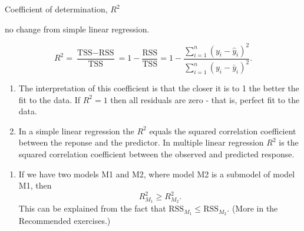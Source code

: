 \documentclass[ignorenonframetext,]{beamer}
\providecommand{\tightlist}{%
  \setlength{\itemsep}{0pt}\setlength{\parskip}{0pt}}
\begin{document}
\begin{frame}

\begin{block}{Coefficient of determination, \(R^2\)}

no change from simple linear regression.

\[R^2 = \frac{\text{TSS}-\text{RSS}}{\text{TSS}}= 1-\frac{\text{RSS}}{\text{TSS}}=1-\frac{\sum_{i=1}^n(y_i-\hat{y}_i)^2}{\sum_{i=1}^n(y_i-\bar{y}_i)^2}.\]

\begin{enumerate}
\def\labelenumi{\arabic{enumi}.}
\item
  The interpretation of this coefficient is that the closer it is to 1
  the better the fit to the data. If \(R^2=1\) then all residuals are
  zero - that is, perfect fit to the data.
\item
  In a simple linear regression the \(R^2\) equals the squared
  correlation coefficient between the reponse and the predictor. In
  multiple linear regression \(R^2\) is the squared correlation
  coefficient between the observed and predicted response.
\end{enumerate}

\end{block}

\end{frame}

\begin{frame}

\begin{enumerate}
\def\labelenumi{\arabic{enumi}.}
\setcounter{enumi}{2}
\tightlist
\item
  If we have two models M1 and M2, where model M2 is a submodel of model
  M1, then \[ R^2_{M_1}\ge R^2_{M_2}.\] This can be explained from the
  fact that \(\text{RSS}_{M_1}\le \text{RSS}_{M_2}\). (More in the
  Recommended exercises.)
\end{enumerate}

\end{frame}
\end{document}
